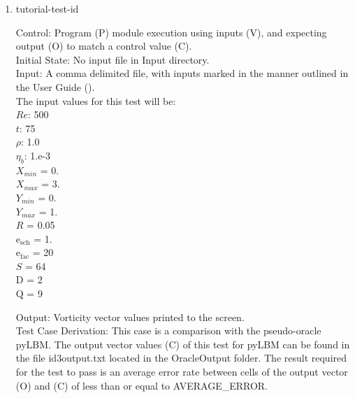 \documentclass[12pt, titlepage]{article}
\newcounter{testcounter} %
\begin{document}
\begin{enumerate}

\item{tutorial-test-id\thetestcounter \\}

Control: Program (P) module execution using inputs (V), and expecting output (O)
to match a control value (C).\\
					
Initial State: No input file in Input directory. \\
					
Input: A comma delimited file, with inputs marked in the manner outlined in the
User Guide (\citet{LBM_UserGuide_PM}).\\The input values for this test will
be:\\
$Re$: 500\\
$t$: 75\\
$\rho$: 1.0\\
$\eta_b$: 1.e-3\\
$X_{min}$ = 0.\\
$X_{max}$ = 3.\\
$Y_{min}$ = 0.\\
$Y_{max}$ = 1.\\
$R$ = 0.05\\
$\mathrm{e_{sch}}$ = 1.\\
$\mathrm{e_{fac}}$ = 20\\
$S$ = 64\\
$\mathrm{D}$ = 2\\
$\mathrm{Q}$ = 9\\


Output: Vorticity vector values printed to the screen. \\

Test Case Derivation: This case is a comparison with the pseudo-oracle
pyLBM. The output vector values (C) of this test for pyLBM can be found in the
file id3output.txt located in the OracleOutput folder. The result required for
the test to pass is an average error rate between cells of the output vector (O)
and (C) of less than or equal to AVERAGE\_ERROR. 


\end{enumerate}
\end{document}
